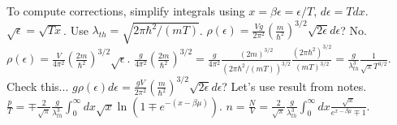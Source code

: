 \documentclass[11pt]{article}
\newcommand{\lambdaT}{\lambda_{th}} %
\begin{document}
To compute corrections, simplify integrals using $x = \beta\epsilon = \epsilon/T$, $d\epsilon = T dx$. $\sqrt{\epsilon} = \sqrt{Tx}$.
Use $\lambdaT = \sqrt{2\pi\hbar^2/(mT)}$. $\rho(\epsilon) = \frac{V g}{2\pi^2} (\frac{m}{\hbar^2})^{3/2} \sqrt{2\epsilon} d\epsilon$? No. $\rho(\epsilon) = \frac{V}{4\pi^2} (\frac{2m}{\hbar^2})^{3/2} \sqrt{\epsilon}$.
$\frac{g}{4\pi^2}(\frac{2m}{\hbar^2})^{3/2} = \frac{g}{4\pi^2} \frac{(2m)^{3/2}}{(2\pi\hbar^2 / (mT))^{3/2}} \frac{(2\pi\hbar^2)^{3/2}}{(mT)^{3/2}} = \frac{g}{\lambdaT^3} \frac{1}{\sqrt{\pi} T^{3/2}}$. Check this...
$g \rho(\epsilon) d\epsilon = \frac{gV}{2\pi^2} (\frac{m}{\hbar^2})^{3/2} \sqrt{2\epsilon} d\epsilon$? Let's use result from notes.
$\frac{p}{T} = \mp \frac{2}{\sqrt{\pi}} \frac{g}{\lambdaT^3} \int_0^\infty dx \sqrt{x} \ln(1 \mp e^{-(x-\beta\mu)})$.
$n = \frac{N}{V} = \frac{2}{\sqrt{\pi}} \frac{g}{\lambdaT^3} \int_0^\infty dx \frac{\sqrt{x}}{e^{x-\beta\mu} \mp 1}$.
\end{document}
